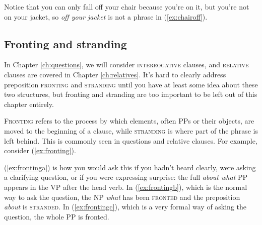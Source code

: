 \begin{multicols}{2}
\ea
    \ea \label{ex:takeoff}
    \z
    \ex \label{ex:chairoff}
        \label{ex:chairoffb}
        \z
    \z
\z
\end{multicols}

Notice that you can only fall off your chair because you're on it, but you're not on your jacket, so \textit{off your jacket} is not a phrase in (\ref{ex:chairoff}).

\subsection{Fronting and stranding} \label{sec:preposition-stranding}

In Chapter \ref{ch:questions}, we will consider \textsc{interrogative} clauses, and \textsc{relative} clauses are covered in Chapter \ref{ch:relatives}. It's hard to clearly address preposition \textsc{fronting} and \textsc{stranding} until you have at least some idea about these two structures, but fronting and stranding are too important to be left out of this chapter entirely.

\textsc{Fronting} refers to the process by which elements, often PPs or their objects, are moved to the beginning of a clause, while \textsc{stranding} is where part of the phrase is left behind. This is commonly seen in questions and relative clauses. For example, consider (\ref{ex:fronting}).

\ea \label{ex:fronting}
    \label{ex:frontinga}
    \label{ex:frontingb}
    \label{ex:frontingc}
    \z
\z

(\ref{ex:frontinga}) is how you would ask this if you hadn't heard clearly, were asking a clarifying question, or if you were expressing surprise: the full \textit{about what} PP appears in the VP after the head verb. In (\ref{ex:frontingb}), which is the normal way to ask the question, the NP \textit{what} has been \textsc{fronted} and the preposition \textit{about} is \textsc{stranded}. In (\ref{ex:frontingc}), which is a very formal way of asking the question, the whole PP is fronted.

